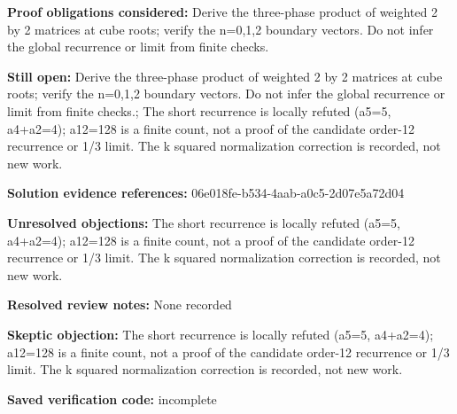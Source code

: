 \documentclass[11pt]{article}
\begin{document}
\textbf{Proof obligations considered:} Derive the three-phase product of weighted 2 by 2 matrices at cube roots; verify the n=0,1,2 boundary vectors. Do not infer the global recurrence or limit from finite checks.\par
\textbf{Still open:} Derive the three-phase product of weighted 2 by 2 matrices at cube roots; verify the n=0,1,2 boundary vectors. Do not infer the global recurrence or limit from finite checks.; The short recurrence is locally refuted (a5=5, a4+a2=4); a12=128 is a finite count, not a proof of the candidate order-12 recurrence or 1/3 limit. The k squared normalization correction is recorded, not new work.\par
\textbf{Solution evidence references:} 06e018fe-b534-4aab-a0c5-2d07e5a72d04\par
\textbf{Unresolved objections:} The short recurrence is locally refuted (a5=5, a4+a2=4); a12=128 is a finite count, not a proof of the candidate order-12 recurrence or 1/3 limit. The k squared normalization correction is recorded, not new work.\par
\textbf{Resolved review notes:} None recorded\par
\textbf{Skeptic objection:} The short recurrence is locally refuted (a5=5, a4+a2=4); a12=128 is a finite count, not a proof of the candidate order-12 recurrence or 1/3 limit. The k squared normalization correction is recorded, not new work.\par
\textbf{Saved verification code:} incomplete\par
\end{document}

